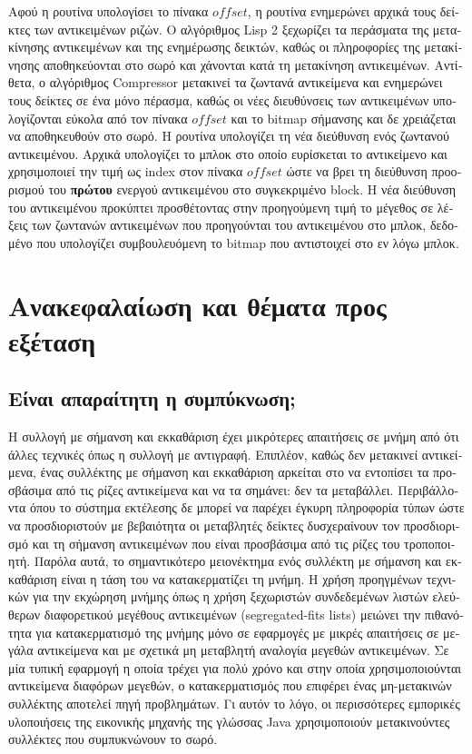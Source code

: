 \begin{greek}
Αφού η ρουτίνα  υπολογίσει το πίνακα $offset$, η 
ρουτίνα  ενημερώνει αρχικά τους δείκτες των 
αντικειμένων ριζών. Ο αλγόριθμος Lisp 2 ξεχωρίζει τα περάσματα της μετακίνησης
αντικειμένων και της ενημέρωσης δεικτών, καθώς οι πληροφορίες της μετακίνησης
αποθηκεύονται στο σωρό και χάνονται κατά τη μετακίνηση αντικειμένων. Αντίθετα,
ο αλγόριθμος Compressor μετακινεί τα ζωντανά αντικείμενα και ενημερώνει τους
δείκτες σε ένα μόνο πέρασμα, καθώς οι νέες διευθύνσεις των αντικειμένων
υπολογίζονται εύκολα από τον πίνακα $offset$ και το bitmap σήμανσης και δε
χρειάζεται να αποθηκευθούν στο σωρό. Η ρουτίνα  υπολογίζει
τη νέα διεύθυνση ενός ζωντανού αντικειμένου. Αρχικά υπολογίζει το
μπλοκ στο οποίο ευρίσκεται το αντικείμενο και χρησιμοποιεί την τιμή ως index
στον πίνακα $offset$ ώστε να βρει τη διεύθυνση προορισμού του \textbf{πρώτου}
ενεργού αντικειμένου στο συγκεκριμένο block. Η νέα διεύθυνση του αντικειμένου
προκύπτει προσθέτοντας στην προηγούμενη τιμή το μέγεθος σε λέξεις των ζωντανών
αντικειμένων που προηγούνται του αντικειμένου στο μπλοκ, δεδομένο που υπολογίζει
συμβουλευόμενη το bitmap που αντιστοιχεί στο εν λόγω μπλοκ.


\section{Ανακεφαλαίωση και θέματα προς εξέταση}
\subsection{Είναι απαραίτητη η συμπύκνωση;}
Η συλλογή με σήμανση και εκκαθάριση έχει μικρότερες απαιτήσεις σε μνήμη από ότι 
άλλες τεχνικές όπως η συλλογή με αντιγραφή. Επιπλέον, καθώς δεν μετακινεί 
αντικείμενα, ένας συλλέκτης με σήμανση και εκκαθάριση αρκείται στο να εντοπίσει 
τα προσβάσιμα από τις ρίζες αντικείμενα και να τα σημάνει: δεν τα μεταβάλλει. 
Περιβάλλοντα όπου το σύστημα εκτέλεσης δε μπορεί να παρέχει έγκυρη πληροφορία 
τύπων ώστε να προσδιοριστούν με βεβαιότητα οι μεταβλητές δείκτες δυσχεραίνουν 
τον προσδιορισμό και τη σήμανση αντικειμένων που είναι προσβάσιμα από τις ρίζες 
του τροποποιητή. Παρόλα αυτά, το σημαντικότερο μειονέκτημα ενός συλλέκτη με σήμανση 
και εκκαθάριση είναι η τάση του να κατακερματίζει τη μνήμη. Η χρήση προηγμένων 
τεχνικών για την εκχώρηση μνήμης όπως η χρήση ξεχωριστών συνδεδεμένων λιστών 
ελεύθερων διαφορετικού μεγέθους αντικειμένων (segregated-fits lists) μειώνει την 
πιθανότητα για κατακερματισμό της μνήμης μόνο σε εφαρμογές με μικρές απαιτήσεις σε 
μεγάλα αντικείμενα και με σχετικά μη μεταβλητή αναλογία μεγεθών αντικειμένων. Σε 
μία τυπική εφαρμογή η οποία τρέχει για πολύ χρόνο και στην οποία χρησιμοποιούνται 
αντικείμενα διαφόρων μεγεθών, ο κατακερματισμός που επιφέρει ένας μη-μετακινών 
συλλέκτης αποτελεί πηγή προβλημάτων. Γι αυτόν το λόγο, οι περισσότερες εμπορικές 
υλοποιήσεις της εικονικής μηχανής της γλώσσας Java χρησιμοποιούν μετακινούντες 
συλλέκτες που συμπυκνώνουν το σωρό.


\end{greek}

